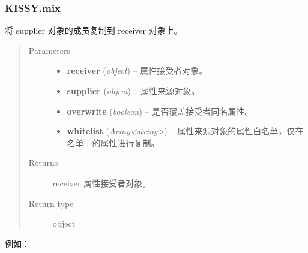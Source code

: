 \documentclass[letterpaper,10pt,english]{sphinxmanual}
\begin{document}
\subsubsection{KISSY.mix}
\label{api/seed/kissy/mix:kissy-mix}\label{api/seed/kissy/mix::doc}

\begin{fulllineitems}
\label{api/seed/kissy/mix:Seed.KISSY.mix}
将 supplier 对象的成员复制到 receiver 对象上。
\begin{quote}\begin{description}
\item[{Parameters}] \leavevmode\begin{itemize}
\item {}
\textbf{receiver} (\emph{object}) -- 属性接受者对象。

\item {}
\textbf{supplier} (\emph{object}) -- 属性来源对象。

\item {}
\textbf{overwrite} (\emph{boolean}) -- 是否覆盖接受者同名属性。

\item {}
\textbf{whitelist} (\emph{Array\textless{}string\textgreater{}}) -- 属性来源对象的属性白名单，仅在名单中的属性进行复制。

\end{itemize}

\item[{Returns}] \leavevmode
receiver 属性接受者对象。

\item[{Return type}] \leavevmode
object

\end{description}\end{quote}

\end{fulllineitems}


例如：
\end{document}
